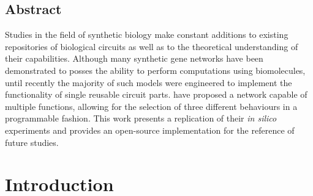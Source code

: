 \subsection*{Abstract}

  Studies in the field of synthetic biology make constant additions to existing repositories of biological circuits as well as to the theoretical understanding of their capabilities.
  Although many synthetic gene networks have been demonstrated to posses the ability to perform computations using biomolecules, until recently the majority of such models were engineered to implement the functionality of single reusable circuit parts.
  \citet{originals} have proposed a network capable of multiple functions, allowing for the selection of three different behaviours in a programmable fashion.
  This work presents a replication of their \textit{in silico} experiments and provides an open-source implementation for the reference of future studies.


\section{Introduction}





